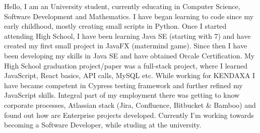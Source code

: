 \documentclass[letter,10pt]{article}
\begin{document}

Hello, I am an University student, currently educating in Computer Science, Software Development and Mathematics. I have began learning to code since my early childhood, mostly creating small scripts in Python. Once I started attending High School, I have been learning Java SE (starting with 7) and have created my first small project in JavaFX (matermind game). Since then I have been developing my skills in Java SE and have obtained Orcale Certification. My High School graduation project/paper was a full-stack project, where I learned JavaScript, React basics, API calls, MySQL etc. While working for KENDAXA I have became competent in Cypress testing framework and further refined my JavaScript skills. Integral part of my employment there was getting to know corporate processes, Atlassian stack (Jira, Confluence, Bitbucket \& Bamboo) and found out how are Enterprise projects developed. Currently I'm working towards becoming a Software Developer, while studing at the university.
\end{document}
